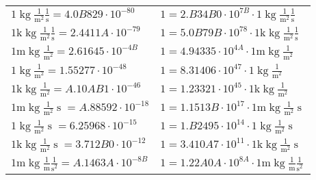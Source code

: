 \begin{center}
\begin{longtable}{l l}
{\color{black}$1 \bm{\mathrm{ }}\operatorname{kg}\frac1{\operatorname{m}^2}\frac1{\operatorname{s}}{}{} = 4.0B829\cdot10^{-80} $}   & {\color{black}$ 1 = 2.B34B0\cdot10^{7B} \cdot 1 \bm{\mathrm{ }}\operatorname{kg}\frac1{\operatorname{m}^2}\frac1{\operatorname{s}}{}{}$}  \\
{\color{gray}$1 \bm{\mathrm{ k}}\operatorname{kg}\frac1{\operatorname{m}^2}\frac1{\operatorname{s}}{}{} = 2.4411A\cdot10^{-79} $}   & {\color{gray}$ 1 = 5.0B79B\cdot10^{78} \cdot 1 \bm{\mathrm{ k}}\operatorname{kg}\frac1{\operatorname{m}^2}\frac1{\operatorname{s}}{}{}$}  \\
{\color{gray}$1 \bm{\mathrm{ m}}\operatorname{kg}\frac1{\operatorname{m}^2}{}{}{} = 2.61645\cdot10^{-4B} $}   & {\color{gray}$ 1 = 4.94335\cdot10^{4A} \cdot 1 \bm{\mathrm{ m}}\operatorname{kg}\frac1{\operatorname{m}^2}{}{}{}$}  \\
{\color{black}$1 \bm{\mathrm{ }}\operatorname{kg}\frac1{\operatorname{m}^2}{}{}{} = 1.55277\cdot10^{-48} $}   & {\color{black}$ 1 = 8.31406\cdot10^{47} \cdot 1 \bm{\mathrm{ }}\operatorname{kg}\frac1{\operatorname{m}^2}{}{}{}$}  \\
{\color{gray}$1 \bm{\mathrm{ k}}\operatorname{kg}\frac1{\operatorname{m}^2}{}{}{} = A.10AB1\cdot10^{-46} $}   & {\color{gray}$ 1 = 1.23321\cdot10^{45} \cdot 1 \bm{\mathrm{ k}}\operatorname{kg}\frac1{\operatorname{m}^2}{}{}{}$}  \\
{\color{gray}$1 \bm{\mathrm{ m}}\operatorname{kg}\frac1{\operatorname{m}^2}{\operatorname{s}}{}{} = A.88592\cdot10^{-18} $}   & {\color{gray}$ 1 = 1.1513B\cdot10^{17} \cdot 1 \bm{\mathrm{ m}}\operatorname{kg}\frac1{\operatorname{m}^2}{\operatorname{s}}{}{}$}  \\
{\color{black}$1 \bm{\mathrm{ }}\operatorname{kg}\frac1{\operatorname{m}^2}{\operatorname{s}}{}{} = 6.25968\cdot10^{-15} $}   & {\color{black}$ 1 = 1.B2495\cdot10^{14} \cdot 1 \bm{\mathrm{ }}\operatorname{kg}\frac1{\operatorname{m}^2}{\operatorname{s}}{}{}$}  \\
{\color{gray}$1 \bm{\mathrm{ k}}\operatorname{kg}\frac1{\operatorname{m}^2}{\operatorname{s}}{}{} = 3.712B0\cdot10^{-12} $}   & {\color{gray}$ 1 = 3.410A7\cdot10^{11} \cdot 1 \bm{\mathrm{ k}}\operatorname{kg}\frac1{\operatorname{m}^2}{\operatorname{s}}{}{}$}  \\
{\color{gray}$1 \bm{\mathrm{ m}}\operatorname{kg}\frac1{\operatorname{m}}\frac1{\operatorname{s}^2}{}{} = A.1463A\cdot10^{-8B} $}   & {\color{gray}$ 1 = 1.22A0A\cdot10^{8A} \cdot 1 \bm{\mathrm{ m}}\operatorname{kg}\frac1{\operatorname{m}}\frac1{\operatorname{s}^2}{}{}$}  \\

\end{longtable}
\end{center}
